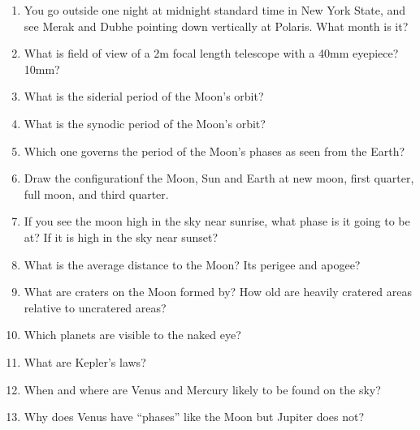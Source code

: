 \documentclass[12pt]{article}
\begin{document}
\begin{enumerate}
\item You go outside one night at midnight standard time in New York
  State, and see Merak and Dubhe pointing down vertically at
  Polaris. What month is it? 
\item What is field of view of a 2m focal length telescope with a 40mm
  eyepiece? 10mm?
\item What is the siderial period of the Moon's orbit?
\item What is the synodic period of the Moon's orbit?
\item Which one governs the period of the Moon's phases as seen from
  the Earth?
\item Draw the configurationf the Moon, Sun and Earth at new moon,
  first quarter, full moon, and third quarter.
\item If you see the moon high in the sky near sunrise, what phase is
  it going to be at? If it is high in the sky near sunset?
\item What is the average distance to the Moon? Its perigee and apogee?
\item What are craters on the Moon formed by? How old are heavily
  cratered areas relative to uncratered areas?
\item Which planets are visible to the naked eye?
\item What are Kepler's laws?
\item When and where are Venus and Mercury likely to be found on the
  sky?
\item Why does Venus have ``phases'' like the Moon but Jupiter does
  not?
\end{enumerate}
\end{document}
